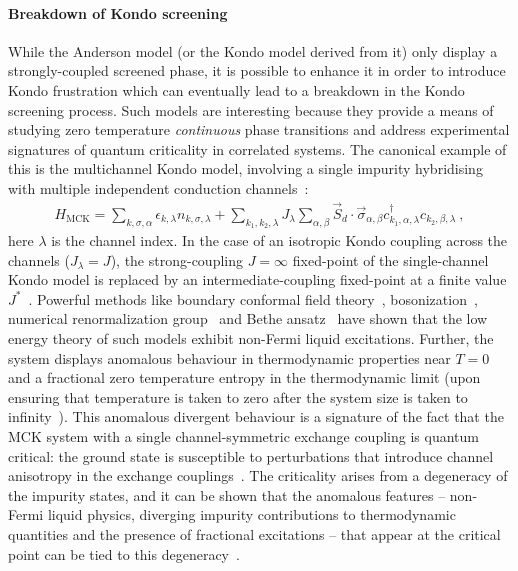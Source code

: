 \paragraph{Breakdown of Kondo screening}
While the Anderson model (or the Kondo model derived from it) only display a strongly-coupled screened phase, it is possible to enhance it in order to introduce Kondo frustration which can eventually lead to a breakdown in the Kondo screening process. Such models are interesting because they provide a means of studying zero temperature {\it continuous} phase transitions and address experimental signatures of quantum criticality in correlated systems. The canonical example of this is the multichannel Kondo model, involving a single impurity hybridising with multiple independent conduction channels~\cite{Noz_blandin_1980}:
\begin{equation}\begin{aligned}
	H_\text{MCK} = \sum_{k,\sigma,\alpha}\epsilon_{k,\lambda} n_{k,\sigma,\lambda} + \sum_{k_1,k_2,\lambda}J_\lambda \sum_{\alpha,\beta}\vec{S}_d \cdot \vec{\sigma}_{\alpha,\beta}c^\dagger_{k_1,\alpha,\lambda}c_{k_2,\beta,\lambda}~,
\end{aligned}\end{equation}
here \(\lambda\) is the channel index. In the case of an isotropic Kondo coupling across the channels (\(J_\lambda = J\)), the strong-coupling \(J=\infty\) fixed-point of the single-channel Kondo model is replaced by an intermediate-coupling fixed-point at a finite value \(J^*\)~\cite{Noz_blandin_1980,Gan_mchannel_1994}. Powerful methods like boundary conformal field theory~\cite{affleck_1991_overscreen,affleck_ludwig_1991,affleck_pang_cox_1992,affleck1993exact,parcollet_olivier_large_N,affleck_2005}, bosonization~\cite{emery_kivelson,clarke_giamarchi_1993,zarand_2000,vondelft_prl_1998,schofield_1997}, numerical renormalization group~\cite{bullaNRGreview,affleck_pang_cox_1992,pang_cox_1991} and Bethe ansatz~\cite{andrei_destri_1984,Tsvelick1984,Tsvelick_1985,andrei_jerez_1995,zarand_costi_2002} have shown that the low energy theory of such models exhibit non-Fermi liquid excitations. Further, the system displays anomalous behaviour in thermodynamic properties near \(T=0\) and a fractional zero temperature entropy in the thermodynamic limit (upon ensuring that temperature is taken to zero after the system size is taken to infinity~\cite{rozhkov_1998,vondelft_prl_1998}).
This anomalous divergent behaviour is a signature of the fact that the MCK system with a single channel-symmetric exchange coupling is quantum critical: the ground state is susceptible to perturbations that introduce channel anisotropy in the exchange couplings~\cite{Noz_blandin_1980,andrei_jerez_1995,affleck_pang_cox_1992,zarand_2000,zheng_2021}. The criticality arises from a degeneracy of the impurity states, and it can be shown that the anomalous features -- non-Fermi liquid physics, diverging impurity contributions to thermodynamic quantities and the presence of fractional excitations -- that appear at the critical point can be tied to this degeneracy~\cite{Patra2023MCK}.

